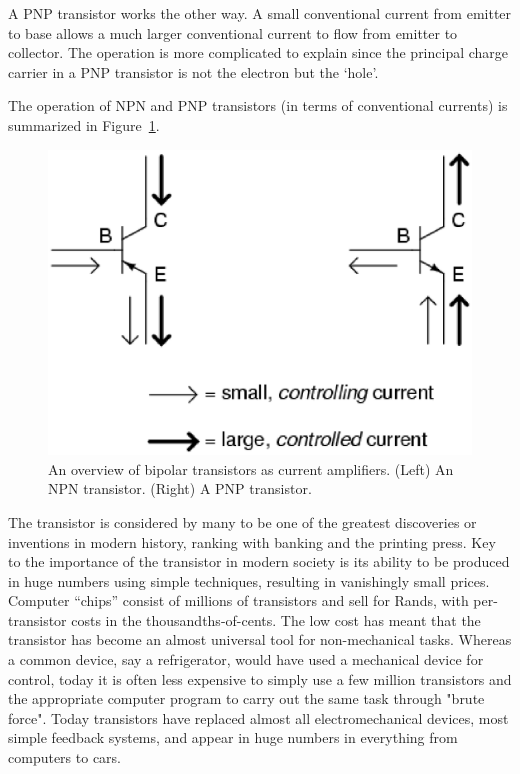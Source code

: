 A PNP transistor works the other way.  A small conventional current from emitter to base allows a much larger conventional current to flow from emitter to collector.  The operation is more complicated to explain since the principal charge carrier in a PNP transistor is not the electron but the `hole'.

The operation of NPN and PNP transistors (in terms of conventional currents) is summarized in Figure~\ref{fig:transcur}.

\begin{figure}
\begin{center}
\includegraphics[scale=0.7]{../../epsimages/tranistorcurrents.eps}
\caption{An overview of bipolar transistors as current amplifiers. (Left) An NPN transistor. (Right) A PNP transistor.}
\label{fig:transcur}
\end{center}
\end{figure}

\begin{IFact}{The transistor is considered by many to be one of the greatest discoveries or inventions in modern history, ranking with banking and the printing press. Key to the importance of the transistor in modern society is its ability to be produced in huge numbers using simple techniques, resulting in vanishingly small prices. Computer ``chips'' consist of millions of transistors and sell for Rands, with per-transistor costs in the thousandths-of-cents. The low cost has meant that the transistor has become an almost universal tool for non-mechanical tasks. Whereas a common device, say a refrigerator, would have used a mechanical device for control, today it is often less expensive to simply use a few million transistors and the appropriate computer program to carry out the same task through "brute force". Today transistors have replaced almost all electromechanical devices, most simple feedback systems, and appear in huge numbers in everything from computers to cars.}\end{IFact} 

